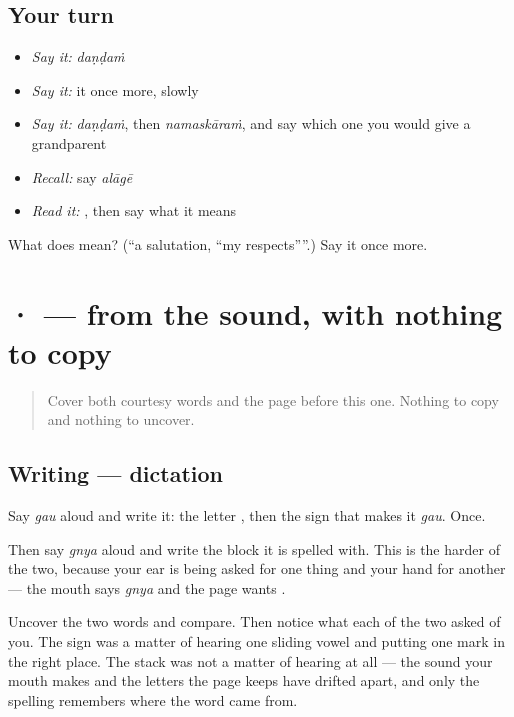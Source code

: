 \subsection*{Your turn}
\begin{itemize}
\raggedright
  \item \emph{Say it:} \emph{daṇḍaṁ}
  \item \emph{Say it:} it once more, slowly
  \item \emph{Say it:} \emph{daṇḍaṁ}, then \emph{namaskāraṁ}, and say which one you would give a grandparent
  \item \emph{Recall:} say \emph{alāgē}
  \item \emph{Read it:} \textbf{}, then say what it means
\end{itemize}

\begin{tcolorbox}[breakable,colback=teal!4,colframe=teal!35!black,title={Before you move on}]
What does  mean? (\textquotedblleft{}a salutation, \textquotedblleft{}my respects\textquotedblright{}\textquotedblright{}.) Say it once more.
\end{tcolorbox}
\section[\texorpdfstring{\te{ఞ} · \te{◌ౌ} (ña · au)}{ఞ · ◌ౌ (ña · au)}]{ ·  — from the sound, with nothing to copy}

\label{lesson:TE-S170-script-dictation-courtesy-letters}



\begin{quote}
Cover both courtesy words and the page before this one. Nothing to copy and nothing to uncover.
\end{quote}

\subsection*{Writing — dictation}
Say \emph{gau} aloud and write it: the letter \textbf{}, then the sign that makes it \emph{gau}. Once.

Then say \emph{gnya} aloud and write the block it is spelled with. This is the harder of the two, because your ear is being asked for one thing and your hand for another — the mouth says \emph{gnya} and the page wants \textbf{}.

\begin{tcolorbox}[breakable,colback=teal!4,colframe=teal!35!black,title={Before you move on}]
Uncover the two words and compare. Then notice what each of the two asked of you. The sign was a matter of hearing one sliding vowel and putting one mark in the right place. The stack was not a matter of hearing at all — the sound your mouth makes and the letters the page keeps have drifted apart, and only the spelling remembers where the word came from.
\end{tcolorbox}
